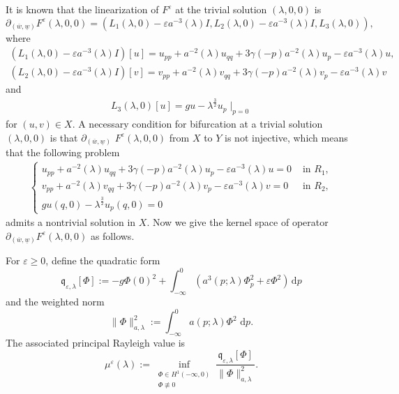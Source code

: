 \documentclass[11pt,reqno]{amsart}
\numberwithin{equation}{section}
\newcommand{\dd}{\,\mathrm{d}}
\theoremstyle{definition}
\theoremstyle{remark}
\begin{document}
It is known that the linearization of $F^{\varepsilon}$ at the
trivial solution $(\lambda,0,0)$ is
$$\partial_{(\overline{w},\underline{w})}F^{\varepsilon}(\lambda, 0,
0)=(L_1(\lambda,0)-\varepsilon a^{-3}(\lambda)I,
L_2(\lambda,0)-\varepsilon a^{-3}(\lambda)I, L_3(\lambda,0)),$$
where
\begin{eqnarray}
(L_1(\lambda,0)-\varepsilon
a^{-3}(\lambda)I)[u]=u_{pp}+a^{-2}(\lambda)u_{qq}+3\gamma(-p)a^{-2}(\lambda)u_p-\varepsilon
a^{-3}(\lambda)u, \label{eq4.14}
\end{eqnarray}
\begin{eqnarray}
(L_2(\lambda,0)-\varepsilon
a^{-3}(\lambda)I)[v]=v_{pp}+a^{-2}(\lambda)v_{qq}+3\gamma(-p)a^{-2}(\lambda)v_p-\varepsilon
a^{-3}(\lambda) v \label{eq4.15}
\end{eqnarray}
and
\begin{eqnarray}
L_3(\lambda,0)[u]= gu-\lambda^{\frac{3}{2}}u_p\mid_{p=0}
\label{eq4.16}
\end{eqnarray}
for $(u,v)\in X$. A necessary condition for bifurcation at a trivial
solution $(\lambda,0,0)$ is that
$\partial_{(\overline{w},\underline{w})}$ $F^{\varepsilon}(\lambda,
0, 0)$ from $X$ to $Y$ is not injective, which means that the
following problem
\begin{eqnarray}
\left\{\begin{array}{llll}
{u_{pp}+a^{-2}(\lambda)u_{qq}+3\gamma(-p)a^{-2}(\lambda)u_p-\varepsilon a^{-3}(\lambda)u=0} & {\text { in } R_1}, \\
{v_{pp}+a^{-2}(\lambda)v_{qq}+3\gamma(-p)a^{-2}(\lambda)v_p-\varepsilon a^{-3}(\lambda) v=0} & { \text { in } R_2}, \\
{gu(q,0)-\lambda^{\frac{3}{2}}u_p(q,0)=0}\end{array}\right.
\label{eq4.17}
\end{eqnarray}
admits a nontrivial solution in $X$. Now we give the kernel space of
operator
$\partial_{(\overline{w},\underline{w})}F^{\varepsilon}(\lambda, 0,
0)$ as follows.

For $\varepsilon\geq 0$, define the quadratic form
\begin{equation}
\label{eq:quadratic-form}
\mathfrak q_{\varepsilon,\lambda}[\Phi]
:=
-g\Phi(0)^2
+
\int_{-\infty}^{0}
\left(
a^3(p;\lambda)\Phi_p^2+\varepsilon\Phi^2
\right)\dd p
\end{equation}
and the weighted norm
\begin{equation}
\label{eq:weighted-norm}
\|\Phi\|_{a,\lambda}^2
:=
\int_{-\infty}^{0}a(p;\lambda)\Phi^2\,\dd p.
\end{equation}
The associated principal Rayleigh value is
\begin{equation}
\label{eq:principal-Rayleigh-value}
\mu^\varepsilon(\lambda)
:=
\inf_{\substack{\Phi\in H^1(-\infty,0)\\ \Phi\not\equiv 0}}
\frac{\mathfrak q_{\varepsilon,\lambda}[\Phi]}
{\|\Phi\|_{a,\lambda}^2}.
\end{equation}
\end{document}
